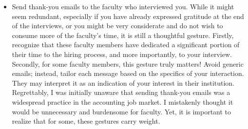 \documentclass[12pt]{article}
\begin{document}
\begin{itemize}
\item Send thank-you emails to the faculty who interviewed you. While it might seem redundant, especially if you have already expressed gratitude at the end of the interviews, or you might be very considerate and do not wish to consume more of the faculty's time, it is still a thoughtful gesture. Firstly, recognize that these faculty members have dedicated a significant portion of their time to the hiring process, and more importantly, to your interview. Secondly, for some faculty members, this gesture truly matters! Avoid generic emails; instead, tailor each message based on the specifics of your interaction. They may interpret it as an indication of your interest in their institution. Regrettably, I was initially unaware that sending thank-you emails was a widespread practice in the accounting job market. I mistakenly thought it would be unnecessary and burdensome for faculty. Yet, it is important to realize that for some, these gestures carry weight.
\end{itemize}
\end{document}
